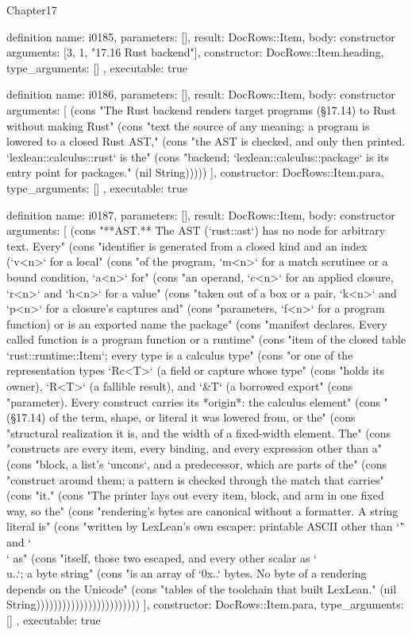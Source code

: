 \begin{lexlean}{Chapter17}
\begin{semanticmodule}
definition{
  name: i0185,
  parameters: [],
  result: DocRows::Item,
  body: constructor{
    arguments: [3, 1, "17.16 Rust backend"],
    constructor: DocRows::Item.heading,
    type_arguments: []
  },
  executable: true
}

definition{
  name: i0186,
  parameters: [],
  result: DocRows::Item,
  body: constructor{
    arguments: [
      (cons "The Rust backend renders target programs (§17.14) to Rust without making Rust" (cons "text the source of any meaning: a program is lowered to a closed Rust AST," (cons "the AST is checked, and only then printed. `lexlean::calculus::rust` is the" (cons "backend; `lexlean::calculus::package` is its entry point for packages." (nil String)))))
    ],
    constructor: DocRows::Item.para,
    type_arguments: []
  },
  executable: true
}

definition{
  name: i0187,
  parameters: [],
  result: DocRows::Item,
  body: constructor{
    arguments: [
      (cons "**AST.** The AST (`rust::ast`) has no node for arbitrary text. Every" (cons "identifier is generated from a closed kind and an index (`v<n>` for a local" (cons "of the program, `m<n>` for a match scrutinee or a bound condition, `a<n>` for" (cons "an operand, `c<n>` for an applied closure, `r<n>` and `h<n>` for a value" (cons "taken out of a box or a pair, `k<n>` and `p<n>` for a closure's captures and" (cons "parameters, `f<n>` for a program function) or is an exported name the package" (cons "manifest declares. Every called function is a program function or a runtime" (cons "item of the closed table `rust::runtime::Item`; every type is a calculus type" (cons "or one of the representation types `Rc<T>` (a field or capture whose type" (cons "holds its owner), `R<T>` (a fallible result), and `&T` (a borrowed export" (cons "parameter). Every construct carries its *origin*: the calculus element" (cons "(§17.14) of the term, shape, or literal it was lowered from, or the" (cons "structural realization it is, and the width of a fixed-width element. The" (cons "constructs are every item, every binding, and every expression other than a" (cons "block, a list's `uncons`, and a predecessor, which are parts of the" (cons "construct around them; a pattern is checked through the match that carries" (cons "it." (cons "The printer lays out every item, block, and arm in one fixed way, so the" (cons "rendering's bytes are canonical without a formatter. A string literal is" (cons "written by LexLean's own escaper: printable ASCII other than `\"` and `\\` as" (cons "itself, those two escaped, and every other scalar as `\\u{..}`; a byte string" (cons "is an array of `0x..` bytes. No byte of a rendering depends on the Unicode" (cons "tables of the toolchain that built LexLean." (nil String))))))))))))))))))))))))
    ],
    constructor: DocRows::Item.para,
    type_arguments: []
  },
  executable: true
}


\end{semanticmodule}
\end{lexlean}
